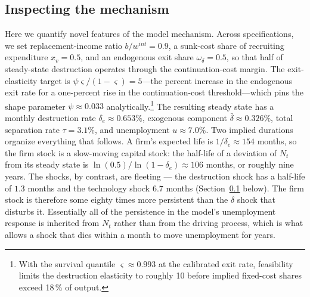 \documentclass[authoryear, review, 12pt]{elsarticle}
\begin{document}
	
	\subsection{Inspecting the mechanism}\label{sec:mechanism_irfs}

	Here we quantify novel features of the model mechanism. Across specifications, we set replacement-income ratio $b/w^{int}=0.9$,
	a sunk-cost share of recruiting expenditure $x_v=0.5$, and an
	endogenous exit share $\omega_\delta=0.5$, so that half of steady-state destruction operates through the continuation-cost margin.
	The exit-elasticity target is $\psi\varsigma/(1-\varsigma)=5$---the
	percent increase in the endogenous exit rate for a one-percent
	rise in the continuation-cost threshold---which pins the shape
	parameter $\psi\approx0.033$ analytically.\footnote{With the
	survival quantile $\varsigma\approx0.993$ at the calibrated exit
	rate, feasibility limits the destruction elasticity to roughly
	10 before implied fixed-cost shares exceed 18\,\% of output.}
	The resulting steady state has a monthly destruction rate
	$\delta_e\approx0.653\%$, exogenous component
	$\bar\delta\approx0.326\%$, total separation rate $\tau=3.1\%$,
	and unemployment $u\approx7.0\%$.
	Two implied durations organize everything that follows.  A firm's
	expected life is $1/\delta_e\approx154$ months, so the firm stock is
	a slow-moving capital stock: the half-life of a deviation of $N_t$ from
	its steady state is $\ln(0.5)/\ln(1-\delta_e)\approx106$ months, or
	roughly nine years.  The shocks, by contrast, are fleeting --- the
	destruction shock has a half-life of $1.3$ months and the technology
	shock $6.7$ months (Section~\ref{sec:mechanism_irfs} below).
	The firm stock is therefore some eighty times more persistent than the
	$\delta$ shock that disturbs it.  Essentially all of the persistence in
	the model's unemployment response is inherited from $N_t$ rather than
	from the driving process, which is what allows a shock that dies within
	a month to move unemployment for years.
\end{document}
